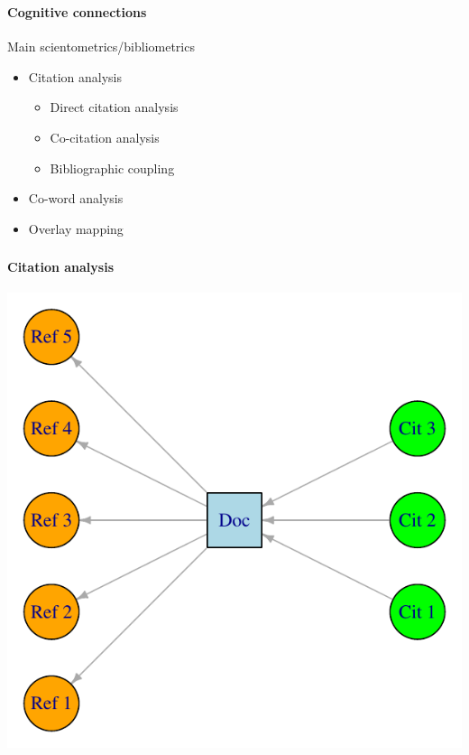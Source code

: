 \documentclass[8pt]{beamer}
\begin{document}
\begin{frame}
\frametitle{\insertsection}
\framesubtitle{Cognitive connections}

Main scientometrics/bibliometrics {\color{blue}{mapping techniques}}
\begin{itemize}
\item Citation analysis
    \begin{itemize}
    \item Direct citation analysis \cite{Garfield1964}
    \item Co-citation analysis \cite{Small1973}
    \item Bibliographic coupling \cite{Kessler1963}
    \end{itemize}
\item Co-word analysis \cite{Callon1983}
\item Overlay mapping \cite{Rafols2010}
\end{itemize}

\end{frame}


\begin{frame}
\frametitle{\insertsection}
\framesubtitle{Citation analysis}

\centering
\includegraphics[width=0.80\textheight]{documents_citations}\\
\end{frame}
\end{document}
